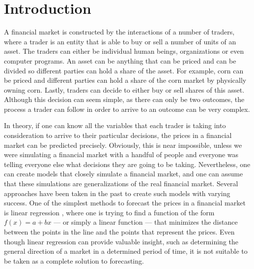 \documentclass[review]{elsarticle}
\begin{document}
\linenumbers

\section{Introduction}
\label{section:introduction}

A financial market is constructed by the interactions of a number of traders,
where a trader is an entity that is able to buy or sell a number of units of an
asset. The traders can either be individual human beings, organizations or even
computer programs. An asset can be anything that can be priced and can be
divided so different parties can hold a share of the asset. For example, corn
can be priced and different parties can hold a share of the corn market by
physically owning corn. Lastly, traders can decide to either buy or sell shares
of this asset. Although this decision can seem simple, as there can only be two
outcomes, the process a trader can follow in order to arrive to an outcome can
be very complex.

In theory, if one can know all the variables that each trader is taking into
consideration to arrive to their particular decisions, the prices in a financial
market can be predicted precisely. Obviously, this is near impossible, unless we
were simulating a financial market with a handful of people and everyone was
telling everyone else what decisions they are going to be taking. Nevertheless,
one can create models that closely simulate a financial market, and one can
assume that these simulations are generalizations of the real financial
market. Several approaches have been taken in the past to create such models
with varying success. One of the simplest methods to forecast the prices in a
financial market is linear %
regression \cite{kutner2004applied}, where one is trying to find a function of
the form $f(x) = a + bx$ --- or simply a linear function --- that minimizes the
distance between the points in the line and the points that represent the
prices. Even though linear regression can provide valuable insight, such as
determining the general direction of a market in a determined period of time, it
is not suitable to be taken as a complete solution to forecasting.
\end{document}
